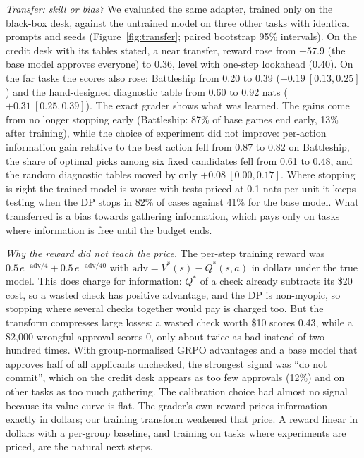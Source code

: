 \documentclass[10pt]{article}
\theoremstyle{definition}
\theoremstyle{remark}
\theoremstyle{plain}
\begin{document}
\emph{Transfer: skill or bias?} We evaluated the same adapter, trained only on the black-box
desk, against the untrained model on three other tasks with identical prompts and seeds
(Figure~\ref{fig:transfer}; paired bootstrap 95\% intervals). On the credit desk with its tables
stated, a near transfer, reward rose from $-57.9$ (the base model approves everyone) to $0.36$,
level with one-step lookahead (0.40). On the far tasks the scores also rose: Battleship from 0.20 to
0.39 ($+0.19\ [0.13, 0.25]$) and the hand-designed diagnostic table from 0.60 to 0.92 nats
($+0.31\ [0.25, 0.39]$). The exact grader shows what was learned. The gains come from no longer
stopping early (Battleship: 87\% of base games end early, 13\% after training), while the choice of
experiment did not improve: per-action information gain relative to the best action fell from
0.87 to 0.82 on Battleship, the share of optimal picks among six fixed candidates fell from 0.61 to
0.48, and the random diagnostic tables moved by only $+0.08\ [0.00, 0.17]$. Where stopping is right
the trained model is worse: with tests priced at 0.1 nats per unit it keeps testing when the DP
stops in 82\% of cases against 41\% for the base model. What transferred is a bias towards
gathering information, which pays only on tasks where information is free until the budget ends.

\emph{Why the reward did not teach the price.} The per-step training reward was
$0.5\,e^{-\mathrm{adv}/4}+0.5\,e^{-\mathrm{adv}/40}$ with $\mathrm{adv}=V^{*}(s)-Q^{*}(s,a)$ in
dollars under the true model. This does charge for information: $Q^{*}$ of a check already
subtracts its \$20 cost, so a wasted check has positive advantage, and the DP is non-myopic, so
stopping where several checks together would pay is charged too. But the transform compresses
large losses: a wasted check worth \$10 scores 0.43, while a \$2{,}000 wrongful approval scores 0,
only about twice as bad instead of two hundred times. With group-normalised GRPO advantages and a
base model that approves half of all applicants unchecked, the strongest signal was ``do not
commit'', which on the credit desk appears as too few approvals (12\%) and on other tasks as too
much gathering. The calibration choice had almost no signal because its value curve is flat. The
grader's own reward prices information exactly in dollars; our training transform weakened that
price. A reward linear in dollars with a per-group baseline, and training on tasks where experiments
are priced, are the natural next steps.
\end{document}

